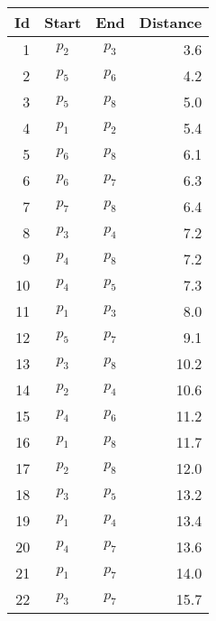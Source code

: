 \documentclass[
	final,
	a4paper,
	oneside,
	parskip=full,
	headings=standardclasses,
	headings=big,
	pointednumbers
]{scrartcl}
\begin{document}
    \begin{minipage}[t]{.5\linewidth}
        \begin{center}
            \begin{tabular}[t]{|r|c|c|r|}
                \hline
                \textbf{Id} & \textbf{Start} & \textbf{End} & \textbf{Distance} \\
                \hline
                1 & $p_{2}$ & $p_{3}$ & 3.6 \\
                2 & $p_{5}$ & $p_{6}$ & 4.2 \\
                3 & $p_{5}$ & $p_{8}$ & 5.0 \\
                4 & $p_{1}$ & $p_{2}$ & 5.4 \\
                \rowcolor[HTML]{DDDDDD} 5 & $p_{6}$ & $p_{8}$ & 6.1 \\
                6 & $p_{6}$ & $p_{7}$ & 6.3 \\
                \rowcolor[HTML]{DDDDDD} 7 & $p_{7}$ & $p_{8}$ & 6.4 \\
                8 & $p_{3}$ & $p_{4}$ & 7.2 \\
                9 & $p_{4}$ & $p_{8}$ & 7.2 \\
                \rowcolor[HTML]{DDDDDD} 10 & $p_{4}$ & $p_{5}$ & 7.3 \\
                \rowcolor[HTML]{DDDDDD} 11 & $p_{1}$ & $p_{3}$ & 8.0 \\
                \rowcolor[HTML]{DDDDDD} 12 & $p_{5}$ & $p_{7}$ & 9.1 \\
                \rowcolor[HTML]{DDDDDD} 13 & $p_{3}$ & $p_{8}$ & 10.2 \\
                \rowcolor[HTML]{DDDDDD} 14 & $p_{2}$ & $p_{4}$ & 10.6 \\
                \rowcolor[HTML]{DDDDDD} 15 & $p_{4}$ & $p_{6}$ & 11.2 \\
                \rowcolor[HTML]{DDDDDD} 16 & $p_{1}$ & $p_{8}$ & 11.7 \\
                \rowcolor[HTML]{DDDDDD} 17 & $p_{2}$ & $p_{8}$ & 12.0 \\
                \rowcolor[HTML]{DDDDDD} 18 & $p_{3}$ & $p_{5}$ & 13.2 \\
                \rowcolor[HTML]{DDDDDD} 19 & $p_{1}$ & $p_{4}$ & 13.4 \\
                \rowcolor[HTML]{DDDDDD} 20 & $p_{4}$ & $p_{7}$ & 13.6 \\
                21 & $p_{1}$ & $p_{7}$ & 14.0 \\
                \rowcolor[HTML]{999999} 22 & $p_{3}$ & $p_{7}$ & 15.7 \\

\end{tabular}
\end{center}
\end{minipage}
\end{document}
